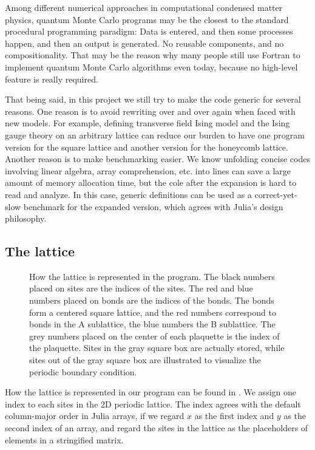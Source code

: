 \documentclass[hyperref, a4paper]{article}
\newcommand*{\tfim}{transverse field Ising model}
\begin{document}
Among different numerical approaches in computational condensed matter physics, 
quantum Monte Carlo programs may be the closest to the standard procedural programming paradigm:
Data is entered, and then some processes happen, and then an output is generated.
No reusable components, and no compositionality.
That may be the reason why many people still use Fortran to implement quantum Monte Carlo algorithms even today,
because no high-level feature is really required.

That being said, in this project we still try to make the code generic for several reasons.
One reason is to avoid rewriting over and over again when faced with new models. 
For example, defining \tfim{} and the Ising gauge theory on an arbitrary lattice can reduce our burden to have one program version for the square lattice and another version for the honeycomb lattice.
Another reason is to make benchmarking easier. 
We know unfolding concise codes involving linear algebra, array comprehension, etc. into lines can save a large amount of memory allocation time,
but the cole after the expansion is hard to read and analyze.
In this case, generic definitions can be used as a correct-yet-slow benchmark for the expanded version, which agrees with Julia's design philosophy.

\subsection{The lattice}

\begin{figure}
    
    \caption{How the lattice is represented in the program. 
    The black numbers placed on sites are the indices of the sites.
    The red and blue numbers placed on bonds are the indices of the bonds. The bonds form a centered square lattice, and the red numbers correspond to bonds in the A sublattice, the blue numbers the B sublattice.
    The grey numbers placed on the center of each plaquette is the index of the plaquette.
    Sites in the gray square box are actually stored, while sites out of the gray square box are illustrated to visualize the periodic boundary condition.}
    \label{fig:label-representation}
\end{figure}

How the lattice is represented in our program can be found in .
We assign one index to each sites in the 2D periodic lattice.
The index agrees with the default column-major order in Julia arrays, if we regard $x$ as the first index and $y$ as the second index of an array, and regard the sites in the lattice as the placeholders of elements in a stringified matrix.
\end{document}
